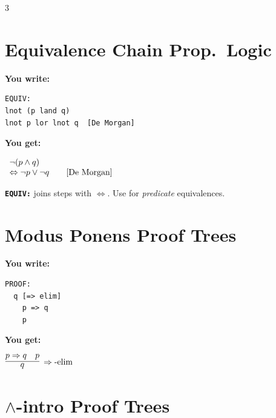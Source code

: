 \documentclass[10pt,landscape,a4paper]{article}
\newcommand{\kw}[1]{\texttt{\bfseries #1}}
\newenvironment{exwrite}%
  {\par\noindent\scriptsize\textbf{You write:}\par\vspace{0pt}\scriptsize}%
  {\vspace{1pt}}
\newenvironment{exget}%
  {\par\noindent\scriptsize\textbf{You get:}\par\vspace{0pt}\small}%
  {\par\vspace{3pt}}
\begin{document}
\begin{multicols}{3}
\section{Equivalence Chain {\normalsize\color{gray}\textrm{\scriptsize Prop.\ Logic}}}

\begin{exwrite}%
\begin{verbatim}
EQUIV:
lnot (p land q)
lnot p lor lnot q  [De Morgan]
\end{verbatim}
\end{exwrite}
\begin{exget}%
\begin{center}
$\begin{array}{l@{\hspace{2em}}r}
\lnot (p \land q) \\
\Leftrightarrow \lnot p \lor \lnot q
  & [\mbox{De Morgan}]
\end{array}$
\end{center}
\end{exget}

{\scriptsize \kw{EQUIV:} joins steps with $\Leftrightarrow$. Use for \emph{predicate} equivalences.}


\section{Modus Ponens {\normalsize\color{gray}\textrm{\scriptsize Proof Trees}}}

\begin{exwrite}%
\begin{verbatim}
PROOF:
  q [=> elim]
    p => q
    p
\end{verbatim}
\end{exwrite}
\begin{exget}%
\begin{center}
$\infer[\Rightarrow\textrm{-elim}]{q}{p \Rightarrow q & p}$
\end{center}
\end{exget}

\section{$\land$-intro {\normalsize\color{gray}\textrm{\scriptsize Proof Trees}}}


\end{multicols}
\end{document}
